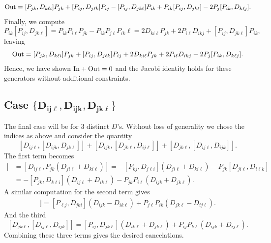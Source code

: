 \documentclass[10pt,a4paper]{amsart}
\numberwithin{equation}{section}
\begin{document}
   \begin{gather*}
   {\rm Out}=[ P_{jk}, D_{k\ell i}] P_{jk}+[P_{ij}, D_{j\ell k}]P_{ij}
 -[ P_{ij}, D_{jk\ell}]P_{ik}+ P_{ik}[ P_{ij}, D_{jk\ell}] -2P_j [ P_{ik}, D_{k\ell j}].
 \end{gather*}
    Finally, we compute
    \[
    P_{ik}[ P_{ij}, D_{jk\ell}] =P_{ik} P_{i\ell} P_{jk}- P_{ik}P_{j\ell}P_{ik}\ell= 2D_{ki\ell}P_{jk}+2P_{i\ell} D_{ikj} + [ P_{ij}, D_{jk\ell}] P_{ik},
    \]
    leaving
   \[
 {\rm Out}= [ P_{jk}, D_{k\ell i}] P_{jk}+[P_{ij}, D_{j\ell k}]P_{ij} +2D_{ki\ell}P_{jk}+2P_{i\ell} D_{ikj} -2P_j [ P_{ik}, D_{k\ell j}].
   \]
  Hence, we have shown ${\rm In} +{\rm Out} =0$ and the Jacobi identity holds for these generators without additional constraints.

 \subsection[Case \{ D\_ijl, D\_ijk, D\_jkl\}]{Case $\boldsymbol{\{ D_{ij\ell}, D_{ijk}, D_{jk\ell}\}}$}
 The final case will be for 3 distinct $D$'s. Without loss of generality we chose the indices as above and consider the quantity
 \[
  [ D_{ij\ell}, [D_{ijk}, D_{jk\ell}]] + [D_{ijk},[D_{jk\ell}, D_{ij\ell}]] +[D_{jk\ell}, [D_{ij\ell},D_{ijk}]].
  \]
 The first term becomes
 \begin{align*}
    [ D_{ij\ell}, [D_{ijk}, D_{jk\ell}]]&=  [ D_{ij\ell}, P_{jk}(D_{ji\ell}+D_{ki\ell})]
    = -[P_{kj},D_{j\ell i}] (D_{ji\ell}+D_{ki\ell})
-P_{jk}[D_{ji\ell}, D_{i\ell k} ]\\
&=  -[P_{jk}, D_{k\ell i}](D_{ij\ell}+D_{ik\ell}) -P_{jk}P_{i\ell}(D_{ijk}+D_{jk\ell}).
 \end{align*}
 A similar computation for the second term gives
 \begin{eqnarray*}
   [D_{ijk},[D_{jk\ell}, D_{ij\ell}]]=[P_{\ell j}, D_{jki}](D_{ijk}-D_{ik\ell})+P_{j\ell}P_{ik}(D_{jk\ell}-D_{ij\ell}). \end{eqnarray*}
And the third
\[ [D_{jk\ell}, [D_{ij\ell},D_{ijk}]] =[P_{ij}, D_{jk\ell}](D_{ik\ell}+D_{jk\ell})+P_{ij}P_{k\ell}(D_{ijk}+D_{ij\ell}).\]
   Combining these three terms gives the desired cancelations.
\end{document}
